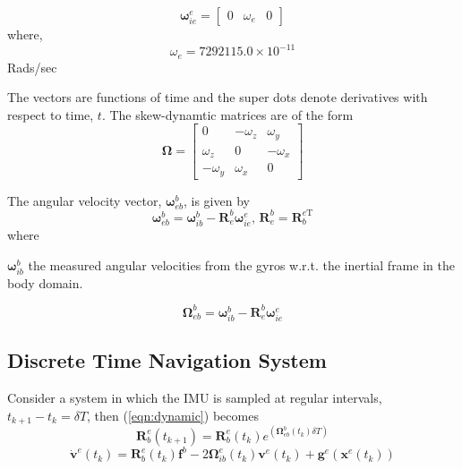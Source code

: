 \documentclass[a4paper]{report}
\numberwithin{equation}{chapter}
\newcommand{\mat}[1]{\boldsymbol{#1}}
\begin{document}
\begin{equation}
\mat{\omega}^e_{ie} =
\begin{bmatrix}
0 & \omega_e & 0
\end{bmatrix}
\end{equation}
where,
\begin{equation}
\omega_e = 7292115.0 \times 10^{-11}
\end{equation} Rads/sec

\bigskip

The vectors are functions of time and the super dots denote derivatives with respect to time, $t$. The skew-dynamtic matrices are of the form
\begin{equation}
\mat{\Omega} =
\begin{bmatrix}
0 & - \omega_z & \omega_y\\
\omega_z & 0 & - \omega_x\\
- \omega_y & \omega_x & 0
\end{bmatrix}
\end{equation}

The angular velocity vector, $\mat{\omega}^b_{eb}$, is given by
\begin{equation}
\mat{\omega}^b_{eb} = \mat{\omega}^b_{ib} - \mat{R}^b_e \mat{\omega}^e_{ie}
\text{, }
\mat{R}^b_e = \mat{R}^{e\mathrm{T}}_b
\end{equation}
where

  $\mat{\omega}^b_{ib}$ the measured angular velocities from the gyros w.r.t. the inertial frame in the body domain.

\begin{equation}
\mat{\Omega}^b_{eb} = \mat{\omega}^b_{ib} - \mat{R}^b_e \mat{\omega}^e_{ie}
\end{equation}

\subsection[Discrete Time Navigation System]{Discrete Time Navigation System}

Consider a system in which the IMU is sampled at regular intervals, $t_{k+1} - t_k = \delta{T}$, then (\ref{eqn:dynamic}) becomes
\begin{equation}
\mat{R}^e_b \left( t_{k + 1} \right) = \mat{R}^e_b \left( t_k \right) e^{\left( \mat{\Omega}^b_{eb} \left( t_k \right) \delta{T} \right)}
\end{equation}
\begin{equation}
\dot{\mat{v}}^e \left( t_k \right) = \mat{R}^e_b \left( t_k \right) \mat{f}^b - 2 \mat{\Omega}^e_{ib} \left( t_k \right) \mat{v}^e \left( t_k \right) + \mat{g}^e \left( \mat{x}^e \left( t_k \right) \right)
\end{equation}
\end{document}
